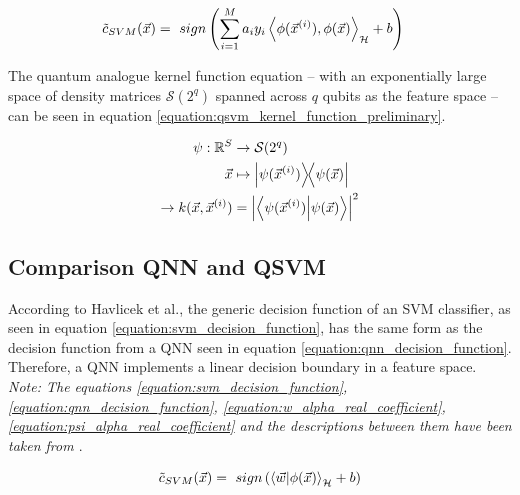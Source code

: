 \begin{equation}
    \centering
    \begin{split}
        \tilde{c}_{SVM}(\vec{x})  &=\ sign\left(\sum_{i=1}^M a_i y_i \expval{\phi(\vec{x}^{(i)}),\phi(\vec{x})}_{\mathcal{H}} + b\right)
    \end{split}
    \label{equation:svm_alternative_decision_function}
\end{equation}

The quantum analogue kernel function equation – with an exponentially large space of density matrices $\mathcal{S}(2^q)$ spanned across $q$ qubits as the feature space – can be seen in equation \ref{equation:qsvm_kernel_function_preliminary}\cite{ThomsenComparingQNNs_QSVM}.

\begin{equation}
    \centering
    \begin{split}
        \psi: \mathbb{R}^S & \rightarrow \mathcal{S}(2^q)\\
        \vec{x} & \mapsto \op{\psi(\vec{x}^{(i)})}{\psi(\vec{x})}\\
        \rightarrow k(\vec{x}, \vec{x}^{(i)}) &= \left|\ip{\psi(\vec{x}^{(i)})}{\psi(\vec{x})}\right|^2
    \end{split}
    \label{equation:qsvm_kernel_function_preliminary}
\end{equation}

\subsection{Comparison QNN and QSVM}
\label{subsection:comparison_qnn_qsvm}
According to Havlicek et al.\cite{havlicekSupervisedLearningQuantum2019}, the generic decision function of an SVM classifier, as seen in equation \ref{equation:svm_decision_function}, has the same form as the decision function from a QNN seen in equation \ref{equation:qnn_decision_function}. Therefore, a QNN implements a linear decision boundary in a feature space. \textit{Note: The equations \ref{equation:svm_decision_function}, \ref{equation:qnn_decision_function}, \ref{equation:w_alpha_real_coefficient}, \ref{equation:psi_alpha_real_coefficient} and the descriptions between them have been taken from \cite{ThomsenComparingQNNs_QSVM}}.

\begin{equation}
    \centering
        \tilde{c}_{SVM}(\vec{x}) =\ sign\left(\ip{\Vec{w}}{\phi(\vec{x})}_{\mathcal{H}}+b\right)
    \label{equation:svm_decision_function}
\end{equation}

